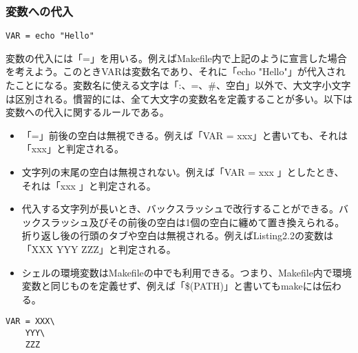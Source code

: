\documentclass[dvipdfmx, 9pt, a4paper]{jsarticle}
\numberwithin{equation}{section}
\begin{document}
\subsubsection{変数への代入}
\begin{lstlisting}[caption=変数への代入]
VAR = echo "Hello"
\end{lstlisting}\par
変数の代入には「=」を用いる。例えばMakefile内で上記のように宣言した場合を考えよう。このときVARは変数名であり、それに「echo "Hello"」が代入されたことになる。変数名に使える文字は「:、=、\#、空白」以外で、大文字小文字は区別される。慣習的には、全て大文字の変数名を定義することが多い。以下は変数への代入に関するルールである。
\begin{itemize}
\item 「=」前後の空白は無視できる。例えば「VAR =     xxx」と書いても、それは「xxx」と判定される。
\item 文字列の末尾の空白は無視されない。例えば「VAR = xxx        」としたとき、それは「xxx        」と判定される。
\item 代入する文字列が長いとき、バックスラッシュで改行することができる。バックスラッシュ及びその前後の空白は1個の空白に纏めて置き換えられる。折り返し後の行頭のタブや空白は無視される。例えばListing2.2の変数は「XXX YYY ZZZ」と判定される。
\item シェルの環境変数はMakefileの中でも利用できる。つまり、Makefile内で環境変数と同じものを定義せず、例えば「\$(PATH)」と書いてもmakeには伝わる。
\end{itemize}
\begin{lstlisting}[caption=変数への代入]
VAR = XXX\
	YYY\
	ZZZ
\end{lstlisting}
\end{document}
